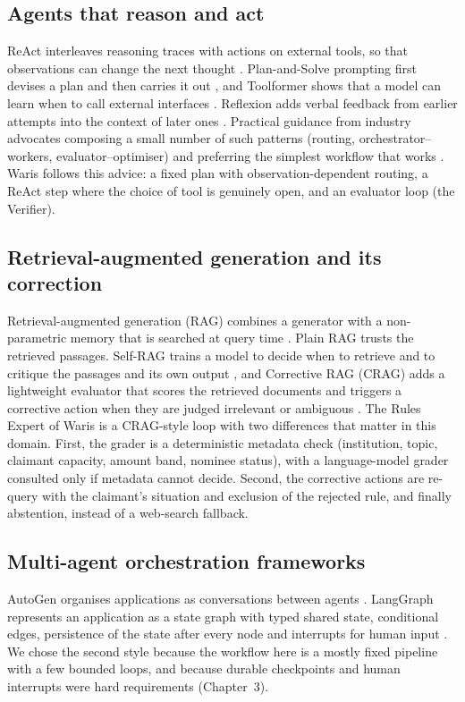 \subsection{Agents that reason and act}
ReAct interleaves reasoning traces with actions on external tools, so that observations can change the next thought \cite{yao2023react}. Plan-and-Solve prompting first devises a plan and then carries it out \cite{wang2023plansolve}, and Toolformer shows that a model can learn when to call external interfaces \cite{schick2023toolformer}. Reflexion adds verbal feedback from earlier attempts into the context of later ones \cite{shinn2023reflexion}. Practical guidance from industry advocates composing a small number of such patterns (routing, orchestrator--workers, evaluator--optimiser) and preferring the simplest workflow that works \cite{anthropic2024agents}. Waris follows this advice: a fixed plan with observation-dependent routing, a ReAct step where the choice of tool is genuinely open, and an evaluator loop (the Verifier).

\subsection{Retrieval-augmented generation and its correction}
Retrieval-augmented generation (RAG) combines a generator with a non-parametric memory that is searched at query time \cite{lewis2020rag}. Plain RAG trusts the retrieved passages. Self-RAG trains a model to decide when to retrieve and to critique the passages and its own output \cite{asai2024selfrag}, and Corrective RAG (CRAG) adds a lightweight evaluator that scores the retrieved documents and triggers a corrective action when they are judged irrelevant or ambiguous \cite{yan2024crag}. The Rules Expert of Waris is a CRAG-style loop with two differences that matter in this domain. First, the grader is a deterministic metadata check (institution, topic, claimant capacity, amount band, nominee status), with a language-model grader consulted only if metadata cannot decide. Second, the corrective actions are re-query with the claimant's situation and exclusion of the rejected rule, and finally abstention, instead of a web-search fallback.

\subsection{Multi-agent orchestration frameworks}
AutoGen organises applications as conversations between agents \cite{wu2023autogen}. LangGraph represents an application as a state graph with typed shared state, conditional edges, persistence of the state after every node and interrupts for human input \cite{langgraph}. We chose the second style because the workflow here is a mostly fixed pipeline with a few bounded loops, and because durable checkpoints and human interrupts were hard requirements (Chapter~3).

